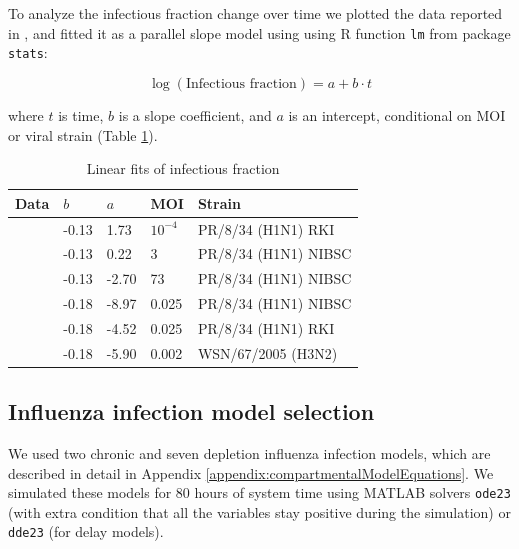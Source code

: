 To analyze the infectious fraction change over time we plotted the data reported in \cite{rudiger2019multiscale, schulze2009infection}, and fitted it as a parallel slope model using using R function \texttt{lm} from package \texttt{stats}:

\begin{equation}
\log(\text{Infectious fraction}) = a + b \cdot t
\end{equation}

where $t$ is time, $b$ is a slope coefficient, and $a$ is an intercept, conditional on MOI \cite{rudiger2019multiscale} or viral strain \cite{schulze2009infection} (Table \ref{table:linearFitsInfectiousFraction}).

\begin{table}[h!]
\centering
\caption[Linear fits of infectious fraction]{Linear fits of infectious fraction}
\label{table:linearFitsInfectiousFraction}

\begin{tabular}{p{2cm} p{2cm} p{2cm} p{2cm} p{4cm}}
\hline 
\textbf{Data} & $b$ & $a$ &  \textbf{MOI} & \textbf{Strain}\\
\hline
\cite{rudiger2019multiscale} & -0.13 & 1.73 & $10^{-4}$ & PR/8/34 (H1N1) RKI\\
\cite{rudiger2019multiscale} & -0.13 & 0.22 & 3 & PR/8/34 (H1N1) NIBSC\\
\cite{rudiger2019multiscale} & -0.13 & -2.70 & 73 & PR/8/34 (H1N1) NIBSC\\
\hline
\cite{schulze2009infection} & -0.18 & -8.97 & 0.025 & PR/8/34 (H1N1) NIBSC\\
\cite{schulze2009infection} & -0.18 & -4.52 & 0.025 & PR/8/34 (H1N1) RKI\\
\cite{schulze2009infection} & -0.18 & -5.90 & 0.002 & WSN/67/2005 (H3N2)\\
\hline
\end{tabular}
\end{table}

\subsection{Influenza infection model selection}

We used two chronic and seven depletion influenza infection models, which are described in detail in Appendix \ref{appendix:compartmentalModelEquations}. We simulated these models for 80 hours of  system time using MATLAB solvers \texttt{ode23} (with extra condition that all the variables stay positive during the simulation) or \texttt{dde23} (for delay models).


